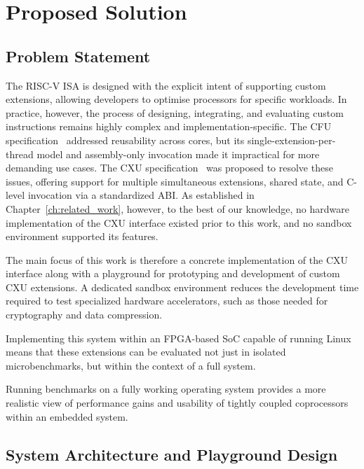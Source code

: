 \chapter{Proposed Solution}
\label{ch:proposed_solution}

\section{Problem Statement}
\label{sec:problem_statement}

The RISC-V ISA is designed with the explicit intent of supporting custom extensions,
allowing developers to optimise processors for specific workloads.
In practice, however, the process of designing, integrating, and evaluating custom
instructions remains highly complex and implementation-specific.
The CFU specification~\cite{Gray2022CFU} addressed reusability across cores, but its
single-extension-per-thread model and assembly-only invocation made it impractical for
more demanding use cases.
The CXU specification~\cite{Gray2025CXU} was proposed to resolve these issues, offering
support for multiple simultaneous extensions, shared state, and C-level invocation via
a standardized ABI.
As established in Chapter~\ref{ch:related_work}, however, to the best of our knowledge, no hardware implementation
of the CXU interface existed prior to this work, and no sandbox environment supported
its features.

The main focus of this work is therefore a concrete implementation of the CXU interface
along with a playground for prototyping and development of custom CXU extensions.
A dedicated sandbox environment reduces the development time
required to test specialized hardware accelerators,
such as those needed for cryptography and data compression.

Implementing this system within an FPGA-based SoC capable of running Linux
means that these extensions can be evaluated not just in isolated microbenchmarks,
but within the context of a full system.

Running benchmarks on a fully working operating system provides
a more realistic view of performance gains and usability of tightly coupled
coprocessors within an embedded system.

\section{System Architecture and Playground Design}
\label{sec:system_arch}

